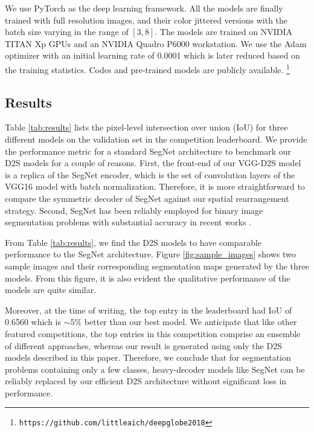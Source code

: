 \documentclass[10pt,twocolumn,letterpaper]{article}
\begin{document}
We use PyTorch \cite{pytorch} as the deep learning framework. All the models are finally trained with full resolution images, and their color jittered versions with the batch size varying in the range of $[3, 8]$. The models are trained on NVIDIA TITAN Xp GPUs and an NVIDIA Quadro P6000 workstation. We use the Adam optimizer \cite{adam} with an initial learning rate of 0.0001 which is later reduced based on the training statistics. Codes and pre-trained models are publicly available. \footnote{\textcolor{red!50!black}{\texttt{https://github.com/littleaich/deepglobe2018}}}




\subsection{Results}

Table \ref{tab:results} lists the pixel-level intersection over union (IoU) \cite{deepglobe} for three different models on the validation set in the competition leaderboard. We provide the performance metric for a standard SegNet architecture to benchmark our D2S models for a couple of reasons. First, the front-end of our VGG-D2S model is a replica of the SegNet encoder, which is the set of convolution layers of the VGG16 model with batch normalization. Therefore, it is more straightforward to compare the symmetric decoder of SegNet against our spatial rearrangement strategy. Second, SegNet has been reliably employed for binary image segmentation problems with substantial accuracy in recent works \cite{aich-cvppp, deepwheat}.

From Table \ref{tab:results}, we find the D2S models to have comparable performance to the SegNet architecture. Figure \ref{fig:sample_images} shows two sample images and their corresponding segmentation maps generated by the three models. From this figure, it is also evident the qualitative performance of the models are quite similar.

Moreover, at the time of writing, the top entry in the leaderboard had IoU of 0.6560 which is $\sim 5\%$ better than our best model. We anticipate that like other featured competitions, the top entries in this competition comprise an ensemble of different approaches, whereas our result is generated using only the D2S models described in this paper. Therefore, we conclude that for segmentation problems containing only a few classes, heavy-decoder models like SegNet can be reliably replaced by our efficient D2S architecture without significant loss in performance.
\end{document}
